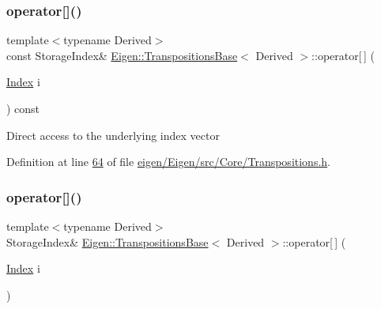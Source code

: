 \subsubsection{\texorpdfstring{operator[]()}{operator[]()}\hspace{0.1cm}{\footnotesize\ttfamily [2/4]}}
{\footnotesize\ttfamily template$<$typename Derived$>$ \\
const Storage\+Index\& \hyperlink{class_eigen_1_1_transpositions_base}{Eigen\+::\+Transpositions\+Base}$<$ Derived $>$\+::operator\mbox{[}$\,$\mbox{]} (\begin{DoxyParamCaption}\item[{\hyperlink{class_eigen_1_1_transpositions_base_a3f5f06118b419e8e6ccbe49ed5b4c91f}{Index}}]{i }\end{DoxyParamCaption}) const\hspace{0.3cm}{\ttfamily [inline]}}

Direct access to the underlying index vector 

Definition at line \hyperlink{eigen_2_eigen_2src_2_core_2_transpositions_8h_source_l00064}{64} of file \hyperlink{eigen_2_eigen_2src_2_core_2_transpositions_8h_source}{eigen/\+Eigen/src/\+Core/\+Transpositions.\+h}.

\mbox{\label{class_eigen_1_1_transpositions_base_a8951554cfdf4840b4bab9864caecc60a}} 
\subsubsection{\texorpdfstring{operator[]()}{operator[]()}\hspace{0.1cm}{\footnotesize\ttfamily [3/4]}}
{\footnotesize\ttfamily template$<$typename Derived$>$ \\
Storage\+Index\& \hyperlink{class_eigen_1_1_transpositions_base}{Eigen\+::\+Transpositions\+Base}$<$ Derived $>$\+::operator\mbox{[}$\,$\mbox{]} (\begin{DoxyParamCaption}\item[{\hyperlink{class_eigen_1_1_transpositions_base_a3f5f06118b419e8e6ccbe49ed5b4c91f}{Index}}]{i }\end{DoxyParamCaption})\hspace{0.3cm}{\ttfamily [inline]}}

